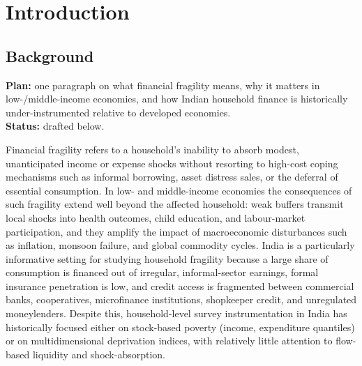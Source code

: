 \documentclass[colorlinks,balance]{asmeconf}
\begin{document}
\section{Introduction}

\subsection{Background}
\begin{outline}
\textbf{Plan:} one paragraph on what financial fragility means, why it matters in low-/middle-income economies, and how Indian household finance is historically under-instrumented relative to developed economies.\\
\textbf{Status:} drafted below.
\end{outline}
Financial fragility refers to a household's inability to absorb modest, unanticipated income or expense shocks without resorting to high-cost coping mechanisms such as informal borrowing, asset distress sales, or the deferral of essential consumption. In low- and middle-income economies the consequences of such fragility extend well beyond the affected household: weak buffers transmit local shocks into health outcomes, child education, and labour-market participation, and they amplify the impact of macroeconomic disturbances such as inflation, monsoon failure, and global commodity cycles. India is a particularly informative setting for studying household fragility because a large share of consumption is financed out of irregular, informal-sector earnings, formal insurance penetration is low, and credit access is fragmented between commercial banks, cooperatives, microfinance institutions, shopkeeper credit, and unregulated moneylenders. Despite this, household-level survey instrumentation in India has historically focused either on stock-based poverty (income, expenditure quantiles) or on multidimensional deprivation indices, with relatively little attention to flow-based liquidity and shock-absorption.
\end{document}
